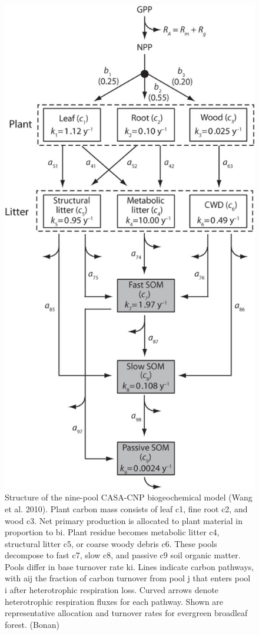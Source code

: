 \documentclass[12pt,oneside]{book}
\begin{document}
\begin{figure}

{\centering \includegraphics[width=0.8\linewidth]{figures/chap5/f54_casa_cnp} 

}

\caption{Structure of the nine-pool CASA-CNP biogeochemical model (Wang et al. 2010). Plant carbon mass consists of leaf c1, fine root c2, and wood c3. Net primary production is allocated to plant material in proportion to bi. Plant residue becomes metabolic litter c4, structural litter c5, or coarse woody debris c6. These pools decompose to fast c7, slow c8, and passive c9 soil organic matter. Pools differ in base turnover rate ki. Lines indicate carbon pathways, with aij the fraction of carbon turnover from pool j that enters pool i after heterotrophic respiration loss. Curved arrows denote heterotrophic respiration fluxes for each pathway. Shown are representative allocation and turnover rates for evergreen broadleaf forest. (Bonan)}\label{fig:f54}
\end{figure}
\end{document}
